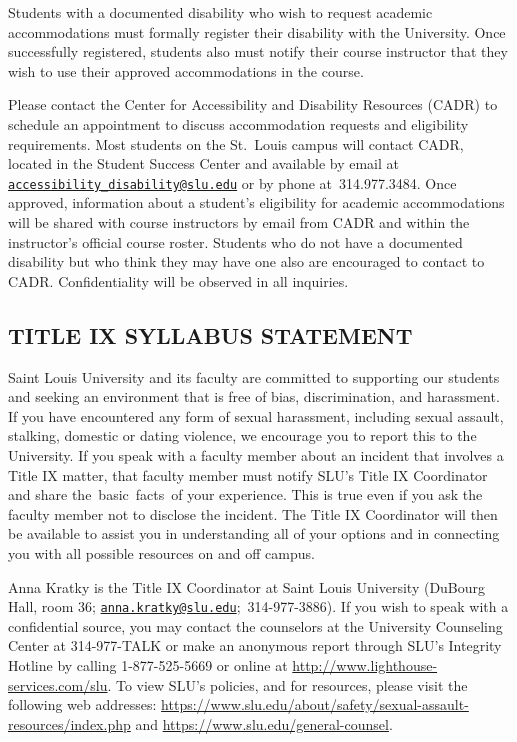 \documentclass[11pt,]{article}
\begin{document}
Students with a documented disability who wish to request academic
accommodations must formally register their disability with the
University. Once successfully registered, students also must notify
their course instructor that they wish to use their approved
accommodations in the course.

Please contact the Center for Accessibility and Disability Resources
(CADR) to schedule an appointment to discuss accommodation requests and
eligibility requirements. Most students on the St.~Louis campus will
contact CADR, located in the Student Success Center and available by
email at
\href{mailto:accessibility_disability@slu.edu}{\nolinkurl{accessibility\_disability@slu.edu}}
or by phone at~314.977.3484. Once approved, information about a
student's eligibility for academic accommodations will be shared with
course instructors by email from CADR and within the instructor's
official course roster. Students who do not have a documented disability
but who think they may have one also are encouraged to contact to CADR.
Confidentiality will be observed in all inquiries.

\subsection{TITLE IX SYLLABUS
STATEMENT}\label{title-ix-syllabus-statement}

Saint Louis University and its faculty are committed to supporting our
students and seeking an environment that is free of bias,
discrimination, and harassment. If you have encountered any form of
sexual harassment, including sexual assault, stalking, domestic or
dating violence, we encourage you to report this to the University. If
you speak with a faculty member about an incident that involves a Title
IX matter, that faculty member must notify SLU's Title IX Coordinator
and share the~basic~facts~of your experience. This is true even if you
ask the faculty member not to disclose the incident. The Title IX
Coordinator will then be available to assist you in understanding all of
your options and in connecting you with all possible resources on and
off campus.

Anna Kratky is the Title IX Coordinator at Saint Louis University
(DuBourg Hall, room 36;
\href{mailto:anna.kratky@slu.edu}{\nolinkurl{anna.kratky@slu.edu}};~314-977-3886).
If you wish to speak with a confidential source, you may contact the
counselors at the University Counseling Center at 314-977-TALK or make
an anonymous report through SLU's Integrity Hotline by calling
1-877-525-5669 or online at
\url{http://www.lighthouse-services.com/slu}. To view SLU's policies,
and for resources, please visit the following web addresses:
\url{https://www.slu.edu/about/safety/sexual-assault-resources/index.php}
and \url{https://www.slu.edu/general-counsel}.
\end{document}
